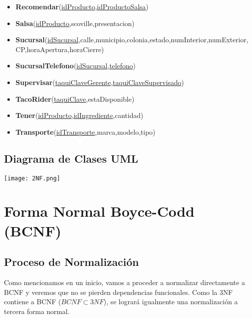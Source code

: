 \documentclass[11pt,letterpaper]{article}
\begin{document}
\begin{itemize}
\item \footnotesize{\textbf{Recomendar}(\underline{idProducto},\underline{idProductoSalsa})}
\item \footnotesize{\textbf{Salsa}(\underline{idProducto},scoville,presentacion)}
\item {\footnotesize \textbf{Sucursal}(\underline{idSucursal},calle,municipio,colonia,estado,numInterior,numExterior,CP,horaApertura,horaCierre)}
\item \footnotesize{\textbf{SucursalTelefono}(\underline{idSucursal},\underline{telefono})}
\item \footnotesize{\textbf{Supervisar}(\underline{taquiClaveGerente},\underline{taquiClaveSupervisado})}
\item \footnotesize{\textbf{TacoRider}(\underline{taquiClave},estaDisponible)}
\item \footnotesize{\textbf{Tener}(\underline{idProducto},\underline{idIngrediente},cantidad)}
\item \footnotesize{\textbf{Transporte}(\underline{idTransporte},marca,modelo,tipo)}



\end{itemize}


\subsection{Diagrama de Clases UML} 

\begin{landscape}
\begin{center}
\begin{minipage}{1\linewidth}
\texttt{[image: 2NF.png]}
\end{minipage}
\end{center}
\end{landscape}
\section{Forma Normal Boyce-Codd (BCNF)}

\subsection{Proceso de Normalización}
Como mencionamos en un inicio, vamos a proceder a normalizar directamente a BCNF y veremos que no se pierden dependencias funcionales. Como la 3NF contiene a BCNF ($BCNF\subset 3NF$), se logrará igualmente una normalización a tercera forma normal.\\
\end{document}
